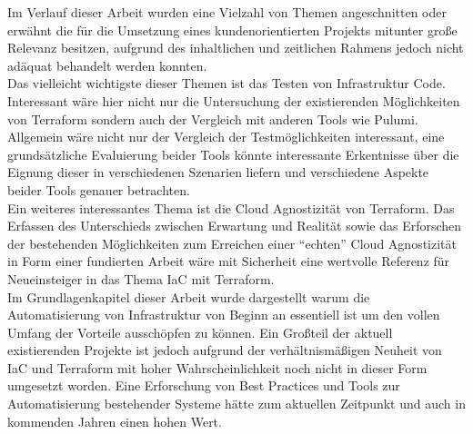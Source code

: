 \begin{spacing}{1.2}
Im Verlauf dieser Arbeit wurden eine Vielzahl von Themen angeschnitten
oder erwähnt die für die Umsetzung eines kundenorientierten Projekts
mitunter große Relevanz besitzen, aufgrund des inhaltlichen und
zeitlichen Rahmens jedoch nicht adäquat behandelt werden konnten.\\
Das vielleicht wichtigste dieser Themen ist das Testen von Infrastruktur
Code. Interessant wäre hier nicht nur die Untersuchung der existierenden
Möglichkeiten von Terraform sondern auch der Vergleich mit anderen
Tools wie Pulumi. Allgemein wäre nicht nur der Vergleich der
Testmöglichkeiten interessant, eine grundsätzliche Evaluierung beider
Tools könnte interessante Erkentnisse über die Eignung dieser
in verschiedenen Szenarien liefern und verschiedene Aspekte beider Tools
genauer betrachten.\\
Ein weiteres interessantes Thema ist die Cloud Agnostizität von
Terraform. Das Erfassen des Unterschieds zwischen Erwartung und Realität
sowie das Erforschen der bestehenden Möglichkeiten zum Erreichen einer
\enquote{echten} Cloud Agnostizität in Form einer fundierten Arbeit
wäre mit Sicherheit eine wertvolle Referenz für Neueinsteiger in das
Thema IaC mit Terraform.\\
Im Grundlagenkapitel dieser Arbeit wurde dargestellt warum die
Automatisierung von Infrastruktur von Beginn an essentiell ist um
den vollen Umfang der Vorteile ausschöpfen zu können. Ein Großteil
der aktuell existierenden Projekte ist jedoch aufgrund der
verhältnismäßigen Neuheit von IaC und Terraform mit hoher
Wahrscheinlichkeit noch nicht in dieser Form umgesetzt worden.
Eine Erforschung von Best Practices und Tools zur Automatisierung
bestehender Systeme hätte zum aktuellen Zeitpunkt und auch in
kommenden Jahren einen hohen Wert.\\

\end{spacing}
